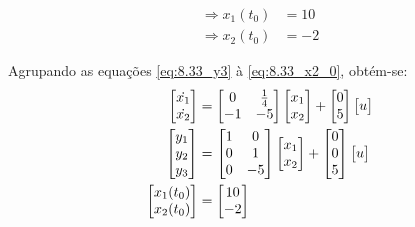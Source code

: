 \documentclass{report}
\begin{document}
\vspace*{-1.5\baselineskip}
\begin{center}
    \begin{align}
        \label{eq:8.33_x1_0}
        \Rightarrow x_1(t_0) &= 10 \\
        \label{eq:8.33_x2_0}
        \Rightarrow x_2(t_0) &= -2
    \end{align}
\end{center}

Agrupando as equações \ref{eq:8.33_y3} à \ref{eq:8.33_x2_0}, obtém-se:
\begin{equation}
    \label{eq:8.33_sol}
    \centering
    \begin{split}
        \begin{bmatrix} \dot{x_1} \\ \dot{x_2} \end{bmatrix} &= \begin{bmatrix} 0 & \frac{1}{4} \\ -1 & -5 \end{bmatrix}
        \begin{bmatrix} x_1 \\ x_2 \end{bmatrix} + \begin{bmatrix} 0 \\ 5 \end{bmatrix} \begin{bmatrix} u \end{bmatrix} \\
        \begin{bmatrix} y_1 \\ y_2 \\ y_3 \end{bmatrix} &= \begin{bmatrix} 1 & 0 \\ 0 & 1 \\ 0 & -5 \end{bmatrix}
        \begin{bmatrix} x_1 \\ x_2 \end{bmatrix} + \begin{bmatrix} 0 \\ 0 \\ 5 \end{bmatrix} \begin{bmatrix} u \end{bmatrix} \\
        \begin{bmatrix} x_1(t_0) \\ x_2(t_0) \end{bmatrix} &= \begin{bmatrix} 10 \\ -2 \end{bmatrix}
    \end{split}
\end{equation}
\end{document}
